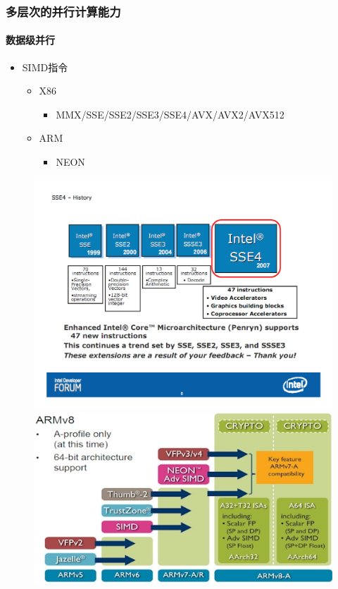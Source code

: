 \documentclass[aspectratio=169]{beamer}
\begin{document}
\begin{frame}
  \frametitle{多层次的并行计算能力}
  \framesubtitle{数据级并行}
  \begin{itemize}
  \item SIMD指令
    \begin{itemize}
    \item X86
      \begin{itemize}
      \item MMX/SSE/SSE2/SSE3/SSE4/AVX/AVX2/AVX512
      \end{itemize}
    \item ARM
      \begin{itemize}
      \item NEON
      \end{itemize}
    \end{itemize}
  \end{itemize}
  \begin{figure}
    \includegraphics[width=.4\textwidth]{intel-simd}\hspace{1cm}
    \includegraphics[width=.4\textwidth]{arm-simd}
  \end{figure}
\end{frame}
\end{document}
